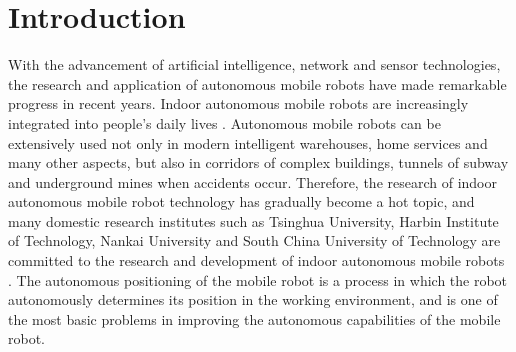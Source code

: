 \documentclass{llncs}
\begin{document}
\section{Introduction}
%
With the advancement of artificial intelligence, network and sensor technologies, the research and application of autonomous mobile robots have made remarkable progress in recent years. Indoor autonomous mobile robots are increasingly integrated into people's daily lives \cite{Garcia2007The}. Autonomous mobile robots can be extensively used not only in modern intelligent warehouses, home services and many other aspects, but also in corridors of complex buildings, tunnels of subway and underground mines when accidents occur. Therefore, the research of indoor autonomous mobile robot technology has gradually become a hot topic, and many domestic research institutes such as Tsinghua University, Harbin Institute of Technology, Nankai University and South China University of Technology are committed to the research and development of indoor autonomous mobile robots \cite{Wu2005Robust,Wu2015A,Yang2015An,yuan2009sprb,yuningbo2017RGBDbae}. The autonomous positioning of the mobile robot is a process in which the robot autonomously determines its position in the working environment, and is one of the most basic problems in improving the autonomous capabilities of the mobile robot.
\end{document}

